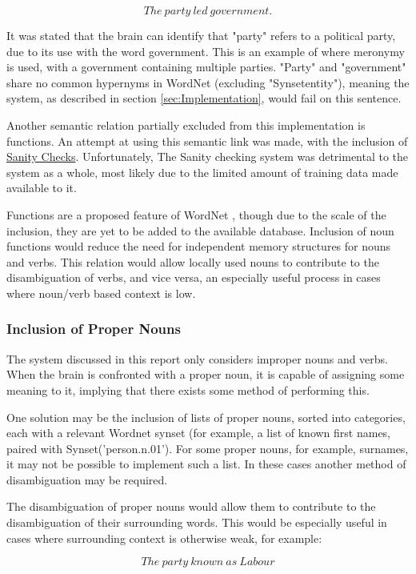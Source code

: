 \documentclass[]{article}
\begin{document}
\[The\: party\: led\: government.\]

It was stated that the brain can identify that "party" refers to a political party, due to its use with the word government. This is an example of where meronymy is used, with a government containing multiple parties. "Party" and "government" share no common hypernyms in WordNet (excluding "Synset{entity}"), meaning the system, as described in section \ref{sec:Implementation}, would fail on this sentence. 

Another semantic relation partially excluded from this implementation is functions. An attempt at using this semantic link was made, with the inclusion of \hyperref[sec:Sanity]{Sanity Checks}. Unfortunately, The Sanity checking system was detrimental to the system as a whole, most likely due to the limited amount of training data made available to it.

Functions are a proposed feature of WordNet \cite{WN2Nouns}, though due to the scale of the inclusion, they are yet to be added to the available database. Inclusion of noun functions would reduce the need for independent memory structures for nouns and verbs. This relation would allow locally used nouns to contribute to the disambiguation of verbs, and vice versa, an especially useful process in cases where noun/verb based context is low.

\subsubsection{Inclusion of Proper Nouns}
\label{sec:FutureInclusion}
The system discussed in this report only considers improper nouns and verbs. When the brain is confronted with a proper noun, it is capable of assigning some meaning to it, implying that there exists some method of performing this.

One solution may be the inclusion of lists of proper nouns, sorted into categories, each with a relevant Wordnet synset (for example, a list of known first names, paired with Synset('person.n.01'). For some proper nouns, for example, surnames, it may not be possible to implement such a list. In these cases another method of disambiguation may be required.

The disambiguation of proper nouns would allow them to contribute to the disambiguation of their surrounding words. This would be especially useful in cases where surrounding context is otherwise weak, for example:

\[The\: party\: known\: as\: Labour\]
\end{document}

